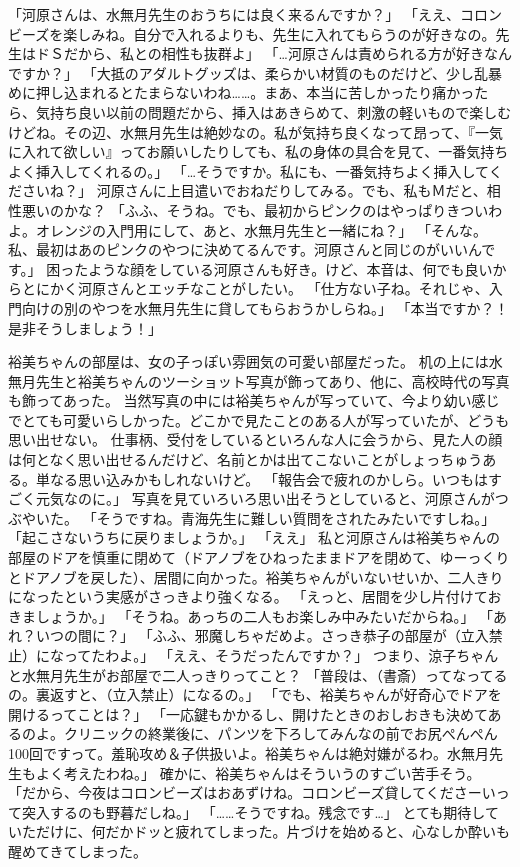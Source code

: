 「河原さんは、水無月先生のおうちには良く来るんですか？」
「ええ、コロンビーズを楽しみね。自分で入れるよりも、先生に入れてもらうのが好きなの。先生はドＳだから、私との相性も抜群よ」
「…河原さんは責められる方が好きなんですか？」
「大抵のアダルトグッズは、柔らかい材質のものだけど、少し乱暴めに押し込まれるとたまらないわね……。まあ、本当に苦しかったり痛かったら、気持ち良い以前の問題だから、挿入はあきらめて、刺激の軽いもので楽しむけどね。その辺、水無月先生は絶妙なの。私が気持ち良くなって昂って、『一気に入れて欲しい』ってお願いしたりしても、私の身体の具合を見て、一番気持ちよく挿入してくれるの。」
「…そうですか。私にも、一番気持ちよく挿入してくださいね？」
河原さんに上目遣いでおねだりしてみる。でも、私もＭだと、相性悪いのかな？
「ふふ、そうね。でも、最初からピンクのはやっぱりきついわよ。オレンジの入門用にして、あと、水無月先生と一緒にね？」
「そんな。私、最初はあのピンクのやつに決めてるんです。河原さんと同じのがいいんです。」
困ったような顔をしている河原さんも好き。けど、本音は、何でも良いからとにかく河原さんとエッチなことがしたい。
「仕方ない子ね。それじゃ、入門向けの別のやつを水無月先生に貸してもらおうかしらね。」
「本当ですか？！是非そうしましょう！」

裕美ちゃんの部屋は、女の子っぽい雰囲気の可愛い部屋だった。
机の上には水無月先生と裕美ちゃんのツーショット写真が飾ってあり、他に、高校時代の写真も飾ってあった。
当然写真の中には裕美ちゃんが写っていて、今より幼い感じでとても可愛いらしかった。どこかで見たことのある人が写っていたが、どうも思い出せない。
仕事柄、受付をしているといろんな人に会うから、見た人の顔は何となく思い出せるんだけど、名前とかは出てこないことがしょっちゅうある。単なる思い込みかもしれないけど。
「報告会で疲れのかしら。いつもはすごく元気なのに。」
写真を見ていろいろ思い出そうとしていると、河原さんがつぶやいた。
「そうですね。青海先生に難しい質問をされたみたいですしね。」
「起こさないうちに戻りましょうか。」
「ええ」
私と河原さんは裕美ちゃんの部屋のドアを慎重に閉めて（ドアノブをひねったままドアを閉めて、ゆーっくりとドアノブを戻した）、居間に向かった。裕美ちゃんがいないせいか、二人きりになったという実感がさっきより強くなる。
「えっと、居間を少し片付けておきましょうか。」
「そうね。あっちの二人もお楽しみ中みたいだからね。」
「あれ？いつの間に？」
「ふふ、邪魔しちゃだめよ。さっき恭子の部屋が（立入禁止）になってたわよ。」
「ええ、そうだったんですか？」
つまり、涼子ちゃんと水無月先生がお部屋で二人っきりってこと？
「普段は、（書斎）ってなってるの。裏返すと、（立入禁止）になるの。」
「でも、裕美ちゃんが好奇心でドアを開けるってことは？」
「一応鍵もかかるし、開けたときのおしおきも決めてあるのよ。クリニックの終業後に、パンツを下ろしてみんなの前でお尻ぺんぺん100回ですって。羞恥攻め＆子供扱いよ。裕美ちゃんは絶対嫌がるわ。水無月先生もよく考えたわね。」
確かに、裕美ちゃんはそういうのすごい苦手そう。
「だから、今夜はコロンビーズはおあずけね。コロンビーズ貸してくださーいって突入するのも野暮だしね。」
「……そうですね。残念です…」
とても期待していただけに、何だかドッと疲れてしまった。片づけを始めると、心なしか酔いも醒めてきてしまった。



